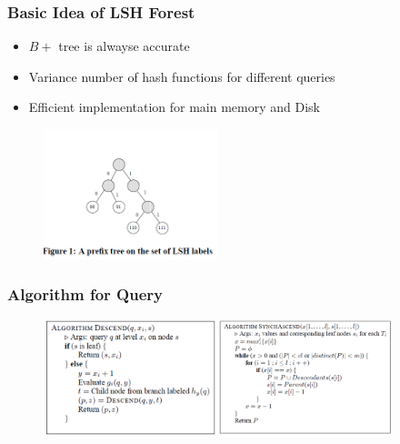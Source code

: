 \begin{frame}
\small
	\frametitle{Basic Idea of LSH Forest}
	\begin{itemize}
		\item $B+$ tree is alwayse accurate
		\vspace{2ex}
		\item Variance number of hash functions for different queries
		\vspace{2ex}
		\item Efficient implementation for main memory and Disk
	\end{itemize}
\begin{figure}
	\begin{center}
		\includegraphics[width=2in]{figures/forest.png}
	\end{center}
\end{figure}
\end{frame}
\begin{frame}
\frametitle{Algorithm for Query}
\begin{figure}
	\begin{center}
		\includegraphics[width=4in]{figures/alg.png}
	\end{center}
\end{figure}
\end{frame}